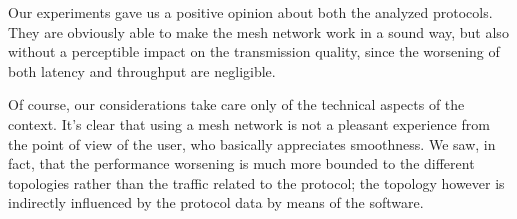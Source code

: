 Our experiments gave us a positive opinion about both the analyzed
protocols. They are obviously able to make the mesh network work in a
sound way, but also without a perceptible impact on the transmission
quality, since the worsening of both latency and throughput are
negligible.

Of course, our considerations take care only of the technical aspects of
the context. It's clear that using a mesh network is not a pleasant
experience from the point of view of the user, who basically appreciates
smoothness. We saw, in fact, that the performance worsening is much more
bounded to the different topologies rather than the traffic related to the
protocol; the topology however is indirectly influenced by the protocol
data by means of the software.
